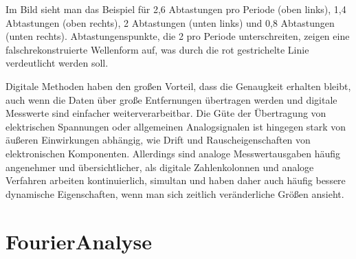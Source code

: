 \documentclass[letterpaper,10pt,english]{jupyterBook}
\begin{document}
\sphinxAtStartPar
Im Bild sieht man das Beispiel für 2,6 Abtastungen pro Periode (oben links), 1,4 Abtastungen (oben rechts), 2 Abtastungen (unten links) und 0,8 Abtastungen (unten rechts). Abtastungenspunkte, die 2 pro Periode unterschreiten, zeigen eine falsch\sphinxhyphen{}rekonstruierte Wellenform auf, was durch die rot gestrichelte Linie verdeutlicht werden soll.

\sphinxAtStartPar
{}

\sphinxAtStartPar
Digitale Methoden haben den großen Vorteil, dass die Genaugkeit erhalten bleibt, auch wenn die Daten über große Entfernungen übertragen werden und digitale Messwerte sind einfacher weiterverarbeitbar. Die Güte der Übertragung von elektrischen Spannungen oder allgemeinen Analogsignalen ist hingegen stark von äußeren Einwirkungen abhängig, wie Drift\sphinxhyphen{} und Rauscheigenschaften von elektronischen Komponenten. Allerdings sind analoge Messwertausgaben häufig angenehmer und übersichtlicher, als digitale Zahlenkolonnen und analoge Verfahren arbeiten kontinuierlich, simultan und haben daher auch häufig bessere dynamische Eigenschaften, wenn man sich zeitlich veränderliche Größen ansieht.

\sphinxstepscope


\section{Fourier\sphinxhyphen{}Analyse}
\label{\detokenize{content/3_FourierAnalyse:fourier-analyse}}\label{\detokenize{content/3_FourierAnalyse::doc}}
\end{document}
